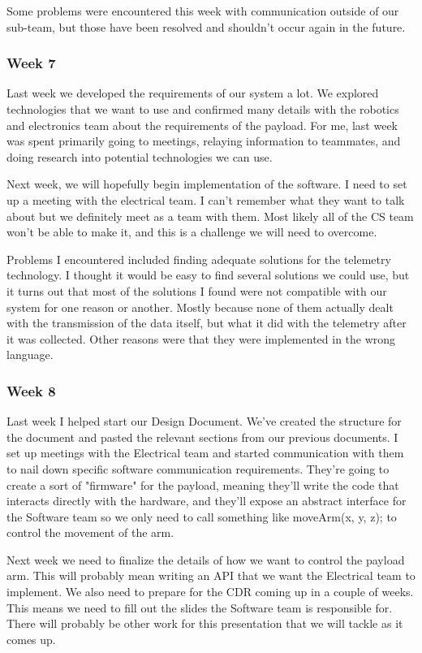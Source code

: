 \documentclass[letterpaper,10pt]{article}
\begin{document}
Some problems were encountered this week with communication outside of our sub-team, but those have been resolved and shouldn't occur again in the future.

\subsubsection{Week 7}
Last week we developed the requirements of our system a lot. We explored technologies that we want to use and confirmed many details with the robotics and electronics team about the requirements of the payload. For me, last week was spent primarily going to meetings, relaying information to teammates, and doing research into potential technologies we can use.

Next week, we will hopefully begin implementation of the software. I need to set up a meeting with the electrical team. I can't remember what they want to talk about but we definitely meet as a team with them. Most likely all of the CS team won't be able to make it, and this is a challenge we will need to overcome.

Problems I encountered included finding adequate solutions for the telemetry technology. I thought it would be easy to find several solutions we could use, but it turns out that most of the solutions I found were not compatible with our system for one reason or another. Mostly because none of them actually dealt with the transmission of the data itself, but what it did with the telemetry after it was collected. Other reasons were that they were implemented in the wrong language.

\subsubsection{Week 8}
Last week I helped start our Design Document. We've created the structure for the document and pasted the relevant sections from our previous documents. I set up meetings with the Electrical team and started communication with them to nail down specific software communication requirements. They're going to create a sort of "firmware" for the payload, meaning they'll write the code that interacts directly with the hardware, and they'll expose an abstract interface for the Software team so we only need to call something like moveArm(x, y, z); to control the movement of the arm.

Next week we need to finalize the details of how we want to control the payload arm. This will probably mean writing an API that we want the Electrical team to implement. We also need to prepare for the CDR coming up in a couple of weeks. This means we need to fill out the slides the Software team is responsible for. There will probably be other work for this presentation that we will tackle as it comes up.
\end{document}
